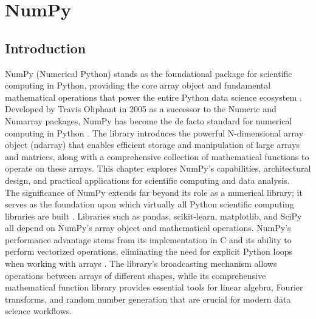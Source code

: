 %
%
%


%
%

\chapter{NumPy}
\label{ch:numpy}

\section{Introduction}
\label{sec:intro}

NumPy (Numerical Python) stands as the foundational package for scientific computing in Python, providing the core array object and fundamental mathematical operations that power the entire Python data science ecosystem \cite{NumPy:2024}. Developed by Travis Oliphant in 2005 as a successor to the Numeric and Numarray packages, NumPy has become the de facto standard for numerical computing in Python \cite{Harris:2020}. The library introduces the powerful N-dimensional array object (ndarray) that enables efficient storage and manipulation of large arrays and matrices, along with a comprehensive collection of mathematical functions to operate on these arrays. This chapter explores NumPy's capabilities, architectural design, and practical applications for scientific computing and data analysis.\\

The significance of NumPy extends far beyond its role as a numerical library; it serves as the foundation upon which virtually all Python scientific computing libraries are built \cite{Harris:2020}. Libraries such as pandas, scikit-learn, matplotlib, and SciPy all depend on NumPy's array object and mathematical operations. NumPy's performance advantage stems from its implementation in C and its ability to perform vectorized operations, eliminating the need for explicit Python loops when working with arrays \cite{Oliphant:2023}. The library's broadcasting mechanism allows operations between arrays of different shapes, while its comprehensive mathematical function library provides essential tools for linear algebra, Fourier transforms, and random number generation that are crucial for modern data science workflows.\\

